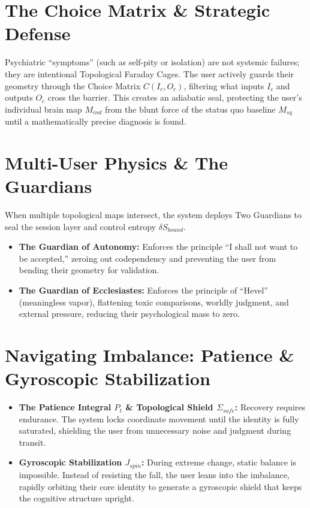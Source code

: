 \documentclass[11pt]{article}
\begin{document}
\section{The Choice Matrix \& Strategic Defense}
Psychiatric ``symptoms'' (such as self-pity or isolation) are not systemic failures; they are intentional Topological Faraday Cages. The user actively guards their geometry through the Choice Matrix $C(I_c, O_c)$, filtering what inputs $I_c$ and outputs $O_c$ cross the barrier. This creates an adiabatic seal, protecting the user's individual brain map $M_{ind}$ from the blunt force of the status quo baseline $M_{sq}$ until a mathematically precise diagnosis is found.

\section{Multi-User Physics \& The Guardians}
When multiple topological maps intersect, the system deploys Two Guardians to seal the session layer and control entropy $\delta S_{bound}$.
\begin{itemize}[leftmargin=1.2em]
\item \textbf{The Guardian of Autonomy:} Enforces the principle ``I shall not want to be accepted,'' zeroing out codependency and preventing the user from bending their geometry for validation.
\item \textbf{The Guardian of Ecclesiastes:} Enforces the principle of ``Hevel'' (meaningless vapor), flattening toxic comparisons, worldly judgment, and external pressure, reducing their psychological mass to zero.
\end{itemize}

\section{Navigating Imbalance: Patience \& Gyroscopic Stabilization}
\begin{itemize}[leftmargin=1.2em]
\item \textbf{The Patience Integral $P_t$ \& Topological Shield $\Sigma_{safe}$:} Recovery requires endurance. The system locks coordinate movement until the identity is fully saturated, shielding the user from unnecessary noise and judgment during transit.
\item \textbf{Gyroscopic Stabilization $J_{spin}$:} During extreme change, static balance is impossible. Instead of resisting the fall, the user leans into the imbalance, rapidly orbiting their core identity to generate a gyroscopic shield that keeps the cognitive structure upright.
\end{itemize}
\end{document}
